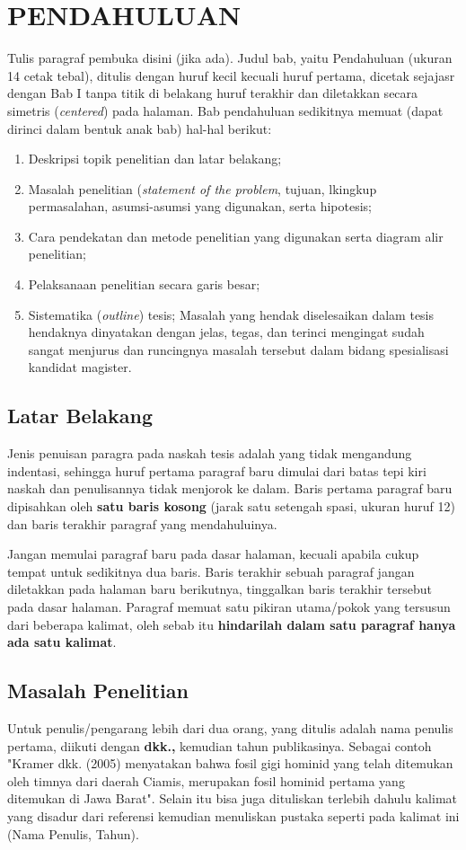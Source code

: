 \chapter{PENDAHULUAN}

Tulis paragraf pembuka disini (jika ada). Judul bab, yaitu Pendahuluan (ukuran 14 cetak tebal), ditulis dengan huruf kecil kecuali huruf pertama, dicetak sejajasr dengan Bab I tanpa titik di belakang huruf terakhir dan diletakkan secara simetris (\textit{centered}) pada halaman. Bab pendahuluan sedikitnya memuat (dapat dirinci dalam bentuk anak bab) hal-hal berikut:
\begin{enumerate}
\item Deskripsi topik penelitian dan latar belakang;
\item Masalah penelitian (\textit{statement of the problem}, tujuan, lkingkup permasalahan, asumsi-asumsi yang digunakan, serta hipotesis;
\item Cara pendekatan dan metode penelitian yang digunakan serta diagram alir penelitian;
\item Pelaksanaan penelitian secara garis besar;
\item Sistematika (\textit{outline}) tesis; Masalah yang hendak diselesaikan dalam tesis hendaknya dinyatakan dengan jelas, tegas, dan terinci mengingat sudah sangat menjurus dan runcingnya masalah tersebut dalam bidang spesialisasi kandidat magister.
\end{enumerate}

\section{Latar Belakang}
Jenis penuisan paragra pada naskah tesis adalah yang tidak mengandung indentasi, sehingga huruf pertama paragraf baru dimulai dari batas tepi kiri naskah dan penulisannya tidak menjorok ke dalam. Baris pertama paragraf baru dipisahkan oleh \textbf{satu baris kosong} (jarak satu setengah spasi, ukuran huruf 12) dan baris terakhir paragraf yang mendahuluinya.

Jangan memulai paragraf baru pada dasar halaman, kecuali apabila cukup tempat untuk sedikitnya dua baris. Baris terakhir sebuah paragraf jangan diletakkan pada halaman baru berikutnya, tinggalkan baris terakhir tersebut pada dasar halaman. Paragraf memuat satu pikiran utama/pokok yang tersusun dari beberapa kalimat, oleh sebab itu \textbf{hindarilah dalam satu paragraf hanya ada satu kalimat}.

\section{Masalah Penelitian}
Untuk penulis/pengarang lebih dari dua orang, yang ditulis adalah nama penulis pertama, diikuti dengan \textbf{dkk.,} kemudian tahun publikasinya. Sebagai contoh "Kramer dkk. (2005) menyatakan bahwa fosil gigi hominid yang telah ditemukan oleh timnya dari daerah Ciamis, merupakan fosil hominid pertama yang ditemukan di Jawa Barat". Selain itu bisa juga dituliskan terlebih dahulu kalimat yang disadur dari referensi kemudian menuliskan pustaka seperti pada kalimat ini (Nama Penulis, Tahun).